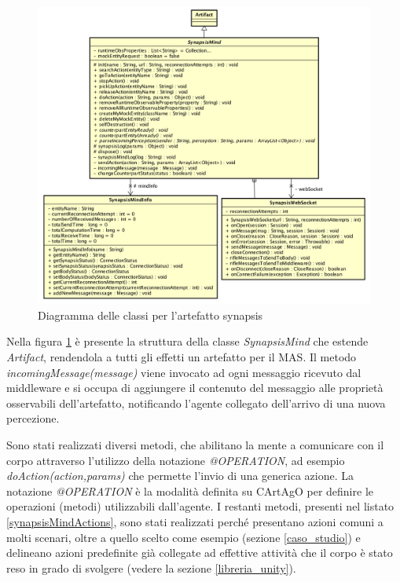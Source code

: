 \begin{figure}[H]
\centering
\includegraphics[width=\linewidth]{figures/diagramma_classi_artefatto.png}
\caption{Diagramma delle classi per l'artefatto synapsis}
\label{classi_artefatto}
\end{figure}

Nella figura \ref{classi_artefatto} è presente la struttura della classe \textit{SynapsisMind} che estende \textit{Artifact}, rendendola a tutti gli effetti un artefatto per il MAS. Il metodo \textit{incomingMessage(message)} viene invocato ad ogni messaggio ricevuto dal middleware e si occupa di aggiungere il contenuto del messaggio alle proprietà osservabili dell'artefatto, notificando l'agente collegato dell'arrivo di una nuova percezione. 

\medskip

Sono stati realizzati diversi metodi, che abilitano la mente a comunicare con il corpo attraverso l'utilizzo della notazione \textit{@OPERATION}, ad esempio \textit{doAction(action,params)} che permette l'invio di una generica azione. La notazione \textit{@OPERATION} è la modalità definita su CArtAgO per definire le operazioni (metodi) utilizzabili dall'agente. I restanti metodi, presenti nel listato \ref{synapsisMindActions}, sono stati realizzati perché presentano azioni comuni a molti scenari, oltre a quello scelto come esempio (sezione \ref{caso_studio}) e delineano azioni predefinite già collegate ad effettive attività che il corpo è stato reso in grado di svolgere (vedere la sezione \ref{libreria_unity}).


